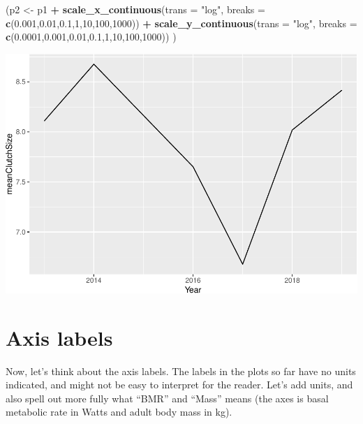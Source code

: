 \documentclass[
  a4paperpaper,
]{book}
\newenvironment{Shaded}{\begin{snugshade}}{\end{snugshade}}
\newcommand{\DataTypeTok}[1]{\textcolor[rgb]{0.13,0.29,0.53}{#1}}
\newcommand{\DecValTok}[1]{\textcolor[rgb]{0.00,0.00,0.81}{#1}}
\newcommand{\FloatTok}[1]{\textcolor[rgb]{0.00,0.00,0.81}{#1}}
\newcommand{\KeywordTok}[1]{\textcolor[rgb]{0.13,0.29,0.53}{\textbf{#1}}}
\newcommand{\NormalTok}[1]{#1}
\newcommand{\OperatorTok}[1]{\textcolor[rgb]{0.81,0.36,0.00}{\textbf{#1}}}
\newcommand{\StringTok}[1]{\textcolor[rgb]{0.31,0.60,0.02}{#1}}
\begin{document}
\begin{Shaded}
\begin{Highlighting}[]
\NormalTok{(p2 \textless{}{-}}\StringTok{ }\NormalTok{p1 }\OperatorTok{+}\StringTok{ }
\StringTok{  }\KeywordTok{scale\_x\_continuous}\NormalTok{(}\DataTypeTok{trans =} \StringTok{"log"}\NormalTok{, }
                     \DataTypeTok{breaks =} \KeywordTok{c}\NormalTok{(}\FloatTok{0.001}\NormalTok{,}\FloatTok{0.01}\NormalTok{,}\FloatTok{0.1}\NormalTok{,}\DecValTok{1}\NormalTok{,}\DecValTok{10}\NormalTok{,}\DecValTok{100}\NormalTok{,}\DecValTok{1000}\NormalTok{)) }\OperatorTok{+}
\StringTok{  }\KeywordTok{scale\_y\_continuous}\NormalTok{(}\DataTypeTok{trans =} \StringTok{"log"}\NormalTok{, }
                     \DataTypeTok{breaks =} \KeywordTok{c}\NormalTok{(}\FloatTok{0.0001}\NormalTok{,}\FloatTok{0.001}\NormalTok{,}\FloatTok{0.01}\NormalTok{,}\FloatTok{0.1}\NormalTok{,}\DecValTok{1}\NormalTok{,}\DecValTok{10}\NormalTok{,}\DecValTok{100}\NormalTok{,}\DecValTok{1000}\NormalTok{))}
\NormalTok{ )}
\end{Highlighting}
\end{Shaded}

\begin{center}\includegraphics{BB852_files/figure-latex/unnamed-chunk-115-1} \end{center}

\hypertarget{axis-labels}{%
\section{Axis labels}\label{axis-labels}}

Now, let's think about the axis labels. The labels in the plots so far have no units indicated, and might not be easy to interpret for the reader. Let's add units, and also spell out more fully what ``BMR'' and ``Mass'' means (the axes is basal metabolic rate in Watts and adult body mass in kg).
\end{document}
